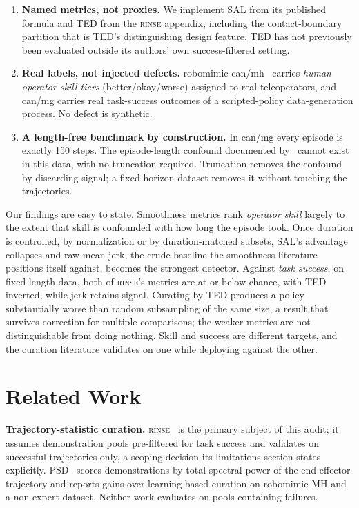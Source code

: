 \documentclass{article}
\newcommand{\rinse}{\textsc{rinse}}
\begin{document}
\begin{enumerate}
\item \textbf{Named metrics, not proxies.} We implement SAL from its
published formula and TED from the \rinse{} appendix, including the
contact-boundary partition that is TED's distinguishing design feature. TED
has not previously been evaluated outside its authors' own
success-filtered setting.
\item \textbf{Real labels, not injected defects.} robomimic
can/mh~\citep{robomimic} carries \emph{human operator skill tiers}
(better/okay/worse) assigned to real teleoperators, and can/mg carries real
task-success outcomes of a scripted-policy data-generation process. No defect
is synthetic.
\item \textbf{A length-free benchmark by construction.} In can/mg every
episode is exactly 150 steps. The episode-length confound documented
by~\citep{bedi-policy} cannot exist in this data, with no truncation
required. Truncation removes the confound by discarding signal; a
fixed-horizon dataset removes it without touching the trajectories.
\end{enumerate}

Our findings are easy to state. Smoothness metrics rank \emph{operator
skill} largely to the extent that skill is confounded with how long the
episode took. Once duration is controlled, by normalization or by
duration-matched subsets, SAL's advantage collapses and raw mean jerk, the
crude baseline the smoothness literature positions itself against, becomes
the strongest detector. Against \emph{task success}, on fixed-length data,
both of \rinse{}'s metrics are at or below chance, with TED inverted, while
jerk retains signal. Curating by TED produces a policy substantially worse
than random subsampling of the same size, a result that survives correction
for multiple comparisons; the weaker metrics are not distinguishable from
doing nothing. Skill and success are
different targets, and the curation literature validates on one while
deploying against the other.

\section{Related Work}

\textbf{Trajectory-statistic curation.} \rinse{}~\citep{rinse} is the primary
subject of this audit; it assumes demonstration pools pre-filtered for task
success and validates on successful trajectories only, a scoping decision its
limitations section states explicitly. PSD~\citep{psd} scores demonstrations
by total spectral power of the end-effector trajectory and reports gains over
learning-based curation on robomimic-MH and a non-expert dataset. Neither
work evaluates on pools containing failures.
\end{document}
